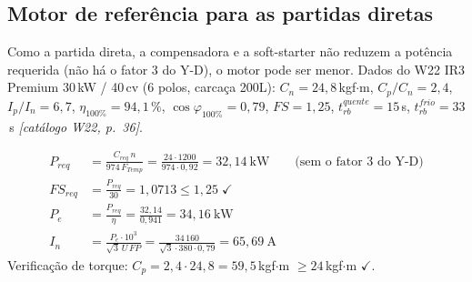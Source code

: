 \documentclass[11pt,a4paper]{article}
\newcommand{\src}[1]{\textit{[#1]}}
\begin{document}
\subsection{Motor de refer\^encia para as partidas diretas}
Como a partida direta, a compensadora e a soft-starter n\~ao reduzem a pot\^encia requerida (n\~ao h\'a o fator $3$ do Y-D), o motor pode ser menor. Dados do W22 IR3 Premium 30\,kW / 40\,cv (6 polos, carca\c{c}a 200L):
$C_n=24{,}8$\,kgf$\cdot$m, $C_p/C_n=2{,}4$, $I_p/I_n=6{,}7$, $\eta_{100\%}=94{,}1\,\%$, $\cos\varphi_{100\%}=0{,}79$, $FS=1{,}25$, $t_{rb}^{quente}=15$\,s, $t_{rb}^{frio}=33$\,s \src{cat\'alogo W22, p.~36}.

\begin{align}
P_{req} &= \frac{C_{req}\,n}{974\,F_{Temp}} = \frac{24\cdot 1200}{974\cdot 0{,}92} = 32{,}14\ \text{kW}
\qquad\text{(sem o fator 3 do Y-D)}\\
FS_{req} &= \frac{P_{req}}{30} = 1{,}0713 \le 1{,}25 \;\checkmark\\
P_e &= \frac{P_{req}}{\eta} = \frac{32{,}14}{0{,}941} = 34{,}16\ \text{kW}\\
I_n &= \frac{P_e\cdot 10^3}{\sqrt{3}\,U\,FP} = \frac{34\,160}{\sqrt{3}\cdot 380\cdot 0{,}79} = 65{,}69\ \text{A}
\end{align}
Verifica\c{c}\~ao de torque: $C_p = 2{,}4\cdot 24{,}8 = 59{,}5$\,kgf$\cdot$m $\ge 24$\,kgf$\cdot$m $\checkmark$.
\end{document}

